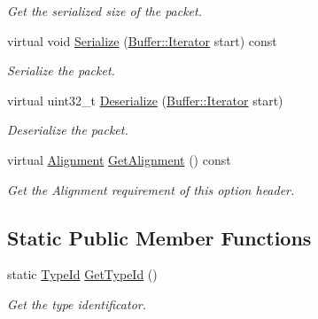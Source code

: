 \begin{DoxyCompactItemize}
\begin{DoxyCompactList}\small\item\em Get the serialized size of the packet. \end{DoxyCompactList}\item 
virtual void \hyperlink{classns3_1_1dsr_1_1DsrOptionRerrHeader_a973a8c73444e9a2f4bd94292f716259c}{Serialize} (\hyperlink{classns3_1_1Buffer_1_1Iterator}{Buffer\+::\+Iterator} start) const 
\begin{DoxyCompactList}\small\item\em Serialize the packet. \end{DoxyCompactList}\item 
virtual uint32\+\_\+t \hyperlink{classns3_1_1dsr_1_1DsrOptionRerrHeader_ab8bc84d5e10a371524ed37035db5dbec}{Deserialize} (\hyperlink{classns3_1_1Buffer_1_1Iterator}{Buffer\+::\+Iterator} start)
\begin{DoxyCompactList}\small\item\em Deserialize the packet. \end{DoxyCompactList}\item 
virtual \hyperlink{structns3_1_1dsr_1_1DsrOptionHeader_1_1Alignment}{Alignment} \hyperlink{classns3_1_1dsr_1_1DsrOptionRerrHeader_a0328e0c31156b934036a70d070c3feeb}{Get\+Alignment} () const 
\begin{DoxyCompactList}\small\item\em Get the Alignment requirement of this option header. \end{DoxyCompactList}\end{DoxyCompactItemize}
\subsection*{Static Public Member Functions}
\begin{DoxyCompactItemize}
\item 
static \hyperlink{classns3_1_1TypeId}{Type\+Id} \hyperlink{classns3_1_1dsr_1_1DsrOptionRerrHeader_a4db8302bbf1d74380397a6fe590a88d2}{Get\+Type\+Id} ()
\begin{DoxyCompactList}\small\item\em Get the type identificator. \end{DoxyCompactList}\end{DoxyCompactItemize}

